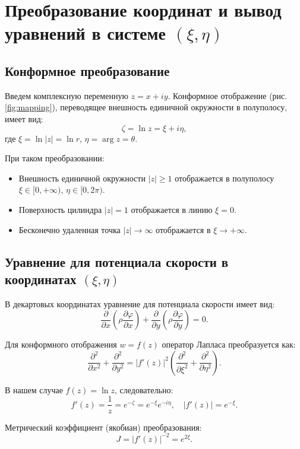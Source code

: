 \section{Преобразование координат и вывод уравнений в системе \texorpdfstring{$(\xi, \eta)$}{(xi, eta)}}
	
	\subsection{Конформное преобразование}
	
	Введем комплексную переменную $z = x + iy$. Конформное отображение (рис. \ref{fig:mapping}), переводящее внешность единичной окружности в полуполосу, имеет вид:
	\begin{equation}
		\zeta = \ln z = \xi + i\eta,
	\end{equation}
	где $\xi = \ln |z| = \ln r$, $\eta = \arg z = \theta$.
	
	При таком преобразовании:
	\begin{itemize}
		\item Внешность единичной окружности $|z| \ge 1$ отображается в полуполосу $\xi \in [0, +\infty)$, $\eta \in [0, 2\pi)$.
		\item Поверхность цилиндра $|z| = 1$ отображается в линию $\xi = 0$.
		\item Бесконечно удаленная точка $|z| \to \infty$ отображается в $\xi \to +\infty$.
	\end{itemize}
	
	\subsection{Уравнение для потенциала скорости в координатах \texorpdfstring{$(\xi, \eta)$}{(xi, eta)}}
	В декартовых координатах уравнение для потенциала скорости имеет вид:
	\[
	\frac{\partial}{\partial x} \left( \rho \frac{\partial \varphi}{\partial x} \right) + \frac{\partial}{\partial y} \left( \rho \frac{\partial \varphi}{\partial y} \right) = 0.
	\]
	
	Для конформного отображения $w = f(z)$ оператор Лапласа преобразуется как:
	\[
	\frac{\partial^2}{\partial x^2} + \frac{\partial^2}{\partial y^2} = |f'(z)|^2 \left( \frac{\partial^2}{\partial \xi^2} + \frac{\partial^2}{\partial \eta^2} \right).
	\]
	
	В нашем случае $f(z) = \ln z$, следовательно:
	\[
	f'(z) = \frac{1}{z} = e^{-\zeta} = e^{-\xi} e^{-i\eta}, \quad |f'(z)| = e^{-\xi}.
	\]
	
	Метрический коэффициент (якобиан) преобразования:
	\[
	J = |f'(z)|^{-2} = e^{2\xi}.
	\]
	
